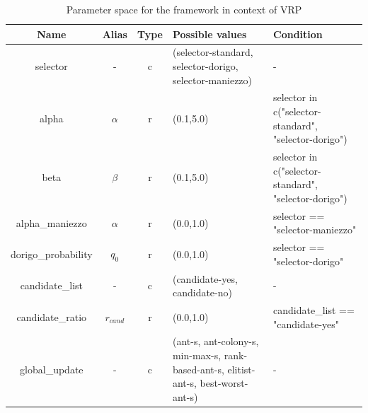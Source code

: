 \documentclass[11pt,a4paper,oneside]{book}
\begin{document}
\begin{table}[]
\centering
\caption{Parameter space for the framework in context of VRP}
\label{tbl:space}
\begin{tabular}{|c|c|c|p{4cm}|p{4cm}|}
\hline
\textbf{Name}  & \textbf{Alias}      & \textbf{Type} & \textbf{Possible values}                                                                & \textbf{Condition}                                                                                     \\ \hline
selector                        & -          & c    & (selector-standard, selector-dorigo, selector-maniezzo)                          & -                                                                                             \\ \hline
alpha                           & $\alpha$   & r    & (0.1,5.0)                                                                      & selector in c("selector-standard", "selector-dorigo")                                          \\ \hline
beta                            & $\beta$    & r    & (0.1,5.0)                                                                      & selector in c("selector-standard", "selector-dorigo")                                          \\ \hline
alpha\_maniezzo                 & $\alpha$   & r    & (0.0,1.0)                                                                      & selector == "selector-maniezzo"                                                               \\ \hline
dorigo\_probability             & $q_0$      & r    & (0.0,1.0)                                                                      & selector == "selector-dorigo"                                                                 \\ \hline
candidate\_list                 & -          & c    & (candidate-yes, candidate-no)                                                   & -                                                                                             \\ \hline
candidate\_ratio                & $r_{cand}$ & r    & (0.0,1.0)                                                                      & candidate\_list == "candidate-yes"                                                            \\ \hline
global\_update                  & -          & c    & (ant-s, ant-colony-s, min-max-s, rank-based-ant-s, elitist-ant-s, best-worst-ant-s) & -                                                                                             \\ \hline

\end{tabular}
\end{table}
\end{document}
